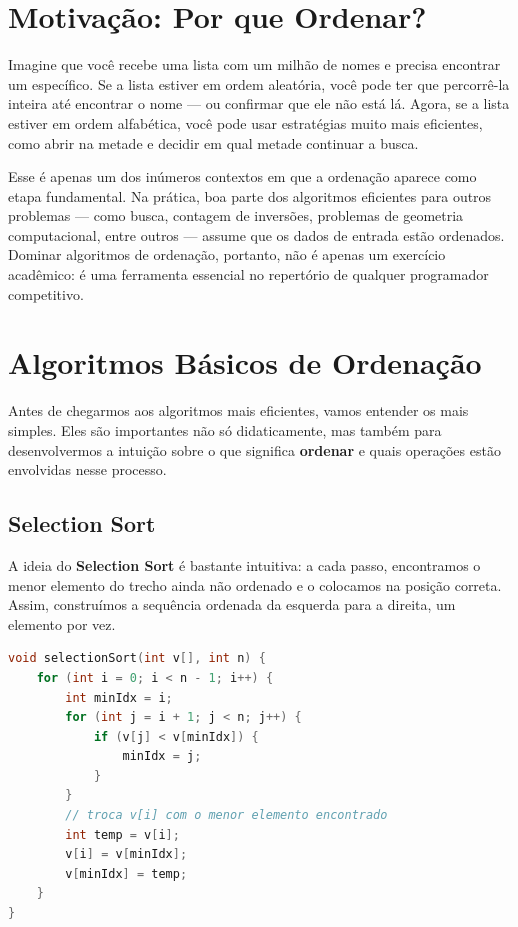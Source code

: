 \documentclass[12pt]{article}
\begin{document}

\section{Motivação: Por que Ordenar?}

Imagine que você recebe uma lista com um milhão de nomes e precisa encontrar um específico. Se a lista estiver em ordem aleatória, você pode ter que percorrê-la inteira até encontrar o nome — ou confirmar que ele não está lá. Agora, se a lista estiver em ordem alfabética, você pode usar estratégias muito mais eficientes, como abrir na metade e decidir em qual metade continuar a busca.

Esse é apenas um dos inúmeros contextos em que a ordenação aparece como etapa fundamental. Na prática, boa parte dos algoritmos eficientes para outros problemas — como busca, contagem de inversões, problemas de geometria computacional, entre outros — assume que os dados de entrada estão ordenados. Dominar algoritmos de ordenação, portanto, não é apenas um exercício acadêmico: é uma ferramenta essencial no repertório de qualquer programador competitivo.


\section{Algoritmos Básicos de Ordenação}

Antes de chegarmos aos algoritmos mais eficientes, vamos entender os mais simples. Eles são importantes não só didaticamente, mas também para desenvolvermos a intuição sobre o que significa \textbf{ordenar} e quais operações estão envolvidas nesse processo.

\subsection{Selection Sort}

A ideia do \textbf{Selection Sort} é bastante intuitiva: a cada passo, encontramos o menor elemento do trecho ainda não ordenado e o colocamos na posição correta. Assim, construímos a sequência ordenada da esquerda para a direita, um elemento por vez.

\begin{lstlisting}[language=C++]
void selectionSort(int v[], int n) {
    for (int i = 0; i < n - 1; i++) {
        int minIdx = i;
        for (int j = i + 1; j < n; j++) {
            if (v[j] < v[minIdx]) {
                minIdx = j;
            }
        }
        // troca v[i] com o menor elemento encontrado
        int temp = v[i];
        v[i] = v[minIdx];
        v[minIdx] = temp;
    }
}
\end{lstlisting}
\end{document}
